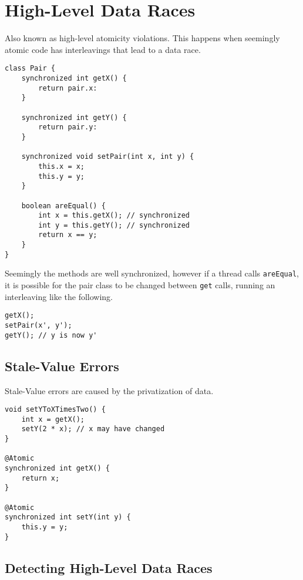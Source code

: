 \section{High-Level Data Races}

Also known as high-level atomicity violations.
This happens when seemingly atomic code has interleavings that lead to a data race.

\begin{lstlisting}[caption={Class \texttt{Pair} definition, notice the synchronized methods.}]
class Pair {
    synchronized int getX() {
        return pair.x:
    }

    synchronized int getY() {
        return pair.y:
    }

    synchronized void setPair(int x, int y) {
        this.x = x;
        this.y = y;
    }

    boolean areEqual() {
        int x = this.getX(); // synchronized
        int y = this.getY(); // synchronized
        return x == y;
    }
}
\end{lstlisting}

Seemingly the methods are well synchronized,
however if a thread calls \texttt{areEqual},
it is possible for the pair class to be changed between \texttt{get} calls,
running an interleaving like the following.

\begin{lstlisting}[caption={Possible incorrect interleaving. Assuming \texttt{y != y'}.}]
getX();
setPair(x', y');
getY(); // y is now y'
\end{lstlisting}

\subsection{Stale-Value Errors}

Stale-Value errors are caused by the privatization of data.

\begin{lstlisting}[caption={Stale-Value error example.}]
void setYToXTimesTwo() {
    int x = getX();
    setY(2 * x); // x may have changed
}

@Atomic
synchronized int getX() {
    return x;
}

@Atomic
synchronized int setY(int y) {
    this.y = y;
}
\end{lstlisting}

\subsection{Detecting High-Level Data Races}

